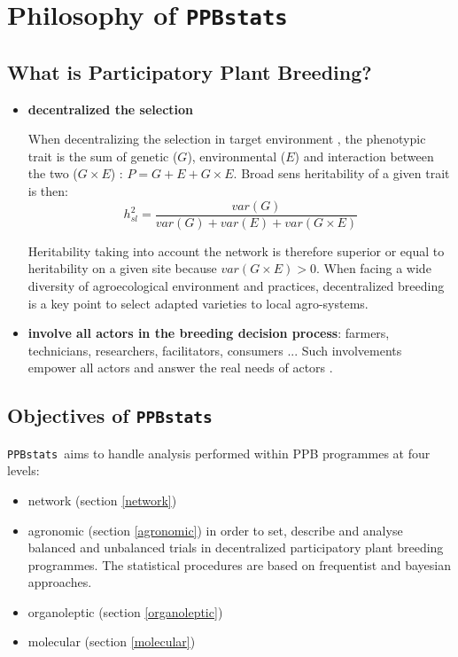 \documentclass{book}\usepackage[]{graphicx}\usepackage[]{color}
\newcommand{\pack}{\texttt{PPBstats}}
\newcommand{\PPB}{Participatory Plant Breeding}
\begin{document}



\chapter{Philosophy of \pack}
\label{philo}

\section{What is \PPB ?}

\begin{itemize}
\item \textbf{decentralized the selection}

When decentralizing the selection in target environment \citep{desclaux_changes_2008}, the phenotypic trait is the sum of genetic ($G$), environmental ($E$) and interaction between the two ($G \times E$) : $P = G + E + G \times E$.
Broad sens heritability of a given trait is then:
\begin{displaymath}
h^2_{sl} = \frac{var(G)}{var(G) + var(E) + var(G\times E)}
\end{displaymath}

Heritability taking into account the network is therefore superior or equal to heritability on a given site because $var(G\times E) > 0$.
When facing a wide diversity of agroecological environment and practices, decentralized breeding is a key point to select adapted varieties to local agro-systems.

\item \textbf{involve all actors in the breeding decision process}: farmers, technicians, researchers, facilitators, consumers ... Such involvements empower all actors and answer the real needs of actors  \citep{sperling_framework_2001}.

\end{itemize}


\section{Objectives of \pack}

\pack~aims to handle analysis performed within PPB programmes at four levels:

\begin{itemize}

\item network (section \ref{network})

\item agronomic (section \ref{agronomic}) in order to set, describe and analyse balanced and unbalanced trials in decentralized participatory plant breeding programmes.
The statistical procedures are based on frequentist and bayesian approaches.

\item organoleptic (section \ref{organoleptic})

\item molecular (section \ref{molecular})

\end{itemize}
\end{document}
